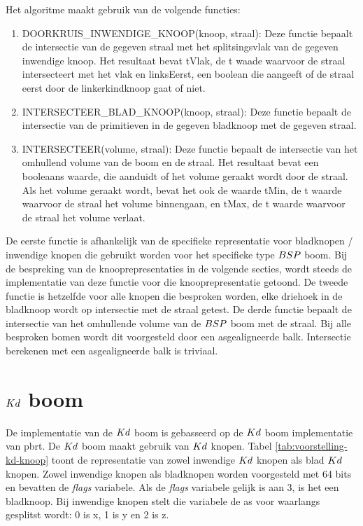 Het algoritme maakt gebruik van de volgende functies:
\begin{enumerate}
    \item DOORKRUIS\_INWENDIGE\_KNOOP(knoop, straal): Deze functie bepaalt de intersectie van de gegeven straal met het splitsingsvlak van de gegeven inwendige knoop. Het resultaat bevat tVlak, de t waade waarvoor de straal intersecteert met het vlak en linksEerst, een boolean die aangeeft of de straal eerst door de linkerkindknoop gaat of niet.
    \item INTERSECTEER\_BLAD\_KNOOP(knoop, straal): Deze functie bepaalt de intersectie van de primitieven in de gegeven bladknoop met de gegeven straal.     
    \item INTERSECTEER(volume, straal): Deze functie bepaalt de intersectie van het omhullend volume van de boom en de straal. Het resultaat bevat een booleaans waarde, die aanduidt of het volume geraakt wordt door de straal. Als het volume geraakt wordt, bevat het ook de waarde tMin, de t waarde waarvoor de straal het volume binnengaan, en tMax, de t waarde waarvoor de straal het volume verlaat.
\end{enumerate}

De eerste functie is afhankelijk van de specifieke representatie voor bladknopen / inwendige knopen die gebruikt worden voor het specifieke type $BSP$ boom.
Bij de bespreking van de knooprepresentaties in de volgende secties, wordt steeds de implementatie van deze functie voor die knooprepresentatie getoond.
De tweede functie is hetzelfde voor alle knopen die besproken worden, elke driehoek in de bladknoop wordt op intersectie met de straal getest.
De derde functie bepaalt de intersectie van het omhullende volume van de $BSP$ boom met de straal. 
Bij alle besproken bomen wordt dit voorgesteld door een asgealigneerde balk.
Intersectie berekenen met een asgealigneerde balk is triviaal.

\section{$Kd$ boom}
\label{sec:h4-kd}

De implementatie van de $Kd$ boom is gebasseerd op de $Kd$ boom implementatie van pbrt.
De $Kd$ boom maakt gebruik van $Kd$ knopen. 
Tabel \ref{tab:voorstelling-kd-knoop} toont de representatie van zowel inwendige $Kd$ knopen als blad $Kd$ knopen. 
Zowel inwendige knopen als bladknopen worden voorgesteld met 64 bits en bevatten de \textit{flags} variabele.
Als de \textit{flags} variabele gelijk is aan 3, is het een bladknoop.
Bij inwendige knopen stelt die variabele de as voor waarlangs gesplitst wordt: 0 is x, 1 is y en 2 is z.\\


